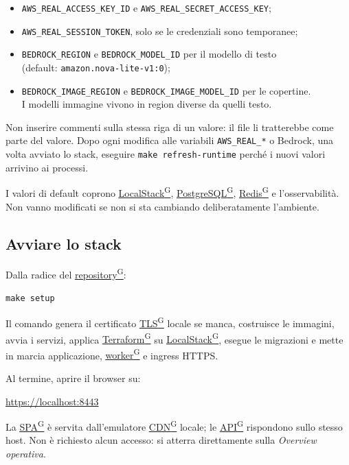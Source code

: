 \documentclass[a4paper,12pt]{article}
\providecommand{\glslink}[2]{\href{https://alittlebyte-19.github.io/Documentazione/glossario.html\#gls-#1}{\underline{#2}\textsuperscript{\scriptsize G}}}
\begin{document}
\begin{itemize}
    \item \texttt{AWS\_REAL\_ACCESS\_KEY\_ID} e \texttt{AWS\_REAL\_SECRET\_ACCESS\_KEY};
    \item \texttt{AWS\_REAL\_SESSION\_TOKEN}, solo se le credenziali sono temporanee;
    \item \texttt{BEDROCK\_REGION} e \texttt{BEDROCK\_MODEL\_ID} per il modello di testo\\
    (default: \texttt{amazon.nova-lite-v1:0});
    \item \texttt{BEDROCK\_IMAGE\_REGION} e \texttt{BEDROCK\_IMAGE\_MODEL\_ID} per le copertine.\\
    I modelli immagine vivono in region diverse da quelli testo.
\end{itemize}

Non inserire commenti sulla stessa riga di un valore: il file li tratterebbe come parte del valore. Dopo ogni modifica alle variabili \texttt{AWS\_REAL\_*} o Bedrock, una volta avviato lo stack, eseguire \texttt{make refresh-runtime} perché i nuovi valori arrivino ai processi.

I valori di default coprono \glslink{localstack}{LocalStack}, \glslink{postgresql}{PostgreSQL}, \glslink{redis}{Redis} e l'osservabilità. Non vanno modificati se non si sta cambiando deliberatamente l'ambiente.

\subsection{Avviare lo stack}

Dalla radice del \glslink{repository}{repository}:

\begin{verbatim}
make setup
\end{verbatim}

Il comando genera il certificato \glslink{tls-transport-layer-security}{TLS} locale se manca, costruisce le immagini, avvia i servizi, applica \glslink{terraform}{Terraform} su \glslink{localstack}{LocalStack}, esegue le migrazioni e mette in marcia applicazione, \glslink{worker}{worker} e ingress HTTPS.

Al termine, aprire il browser su:

\url{https://localhost:8443}

La \glslink{spa-single-page-application}{SPA} è servita dall'emulatore \glslink{cdn-content-delivery-network}{CDN} locale; le \glslink{api-application-programming-interface}{API} rispondono sullo stesso host. Non è richiesto alcun accesso: si atterra direttamente sulla \textit{Overview operativa}.
\end{document}
